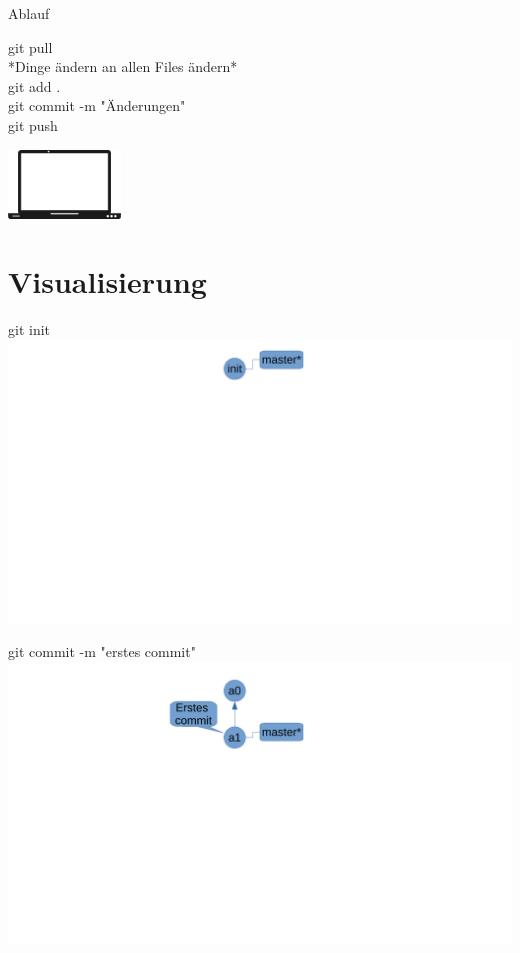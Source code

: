 \documentclass{beamer}
\begin{document}
\begin{frame}{Ablauf}
    \begin{minipage}[b]{70mm}
 
 git pull \\
 \newline
 *Dinge ändern an allen Files ändern* \\
 \newline
 git add . \\
 \newline
 git commit -m "Änderungen" \\
 \newline
 git push \\
    \end{minipage}
            \hfill    
    \begin{minipage}[b]{30mm}
        \includegraphics[width=30mm]{pictures/laptop.png}
    \end{minipage}
\end{frame}

\section{Visualisierung}

\begin{frame}{git init}
\includegraphics[scale=0.5]{pictures/init.pdf}
\end{frame}

\begin{frame}{git commit -m "erstes commit"}
\includegraphics[scale=0.5]{pictures/first_commit.pdf}
\end{frame}
\end{document}
